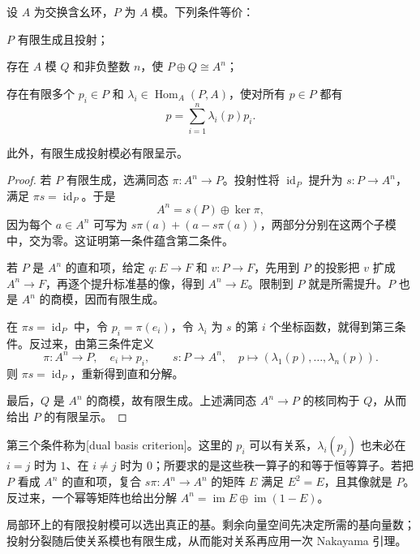 \begin{proposition}
\label{g5:prop:projective-dual-basis}
	设 \(A\) 为交换含幺环，\(P\) 为 \(A\) 模。下列条件等价：
	\begin{equivalences}
		\item \(P\) 有限生成且投射；
		\item 存在 \(A\) 模 \(Q\) 和非负整数 \(n\)，使 \(P\oplus Q\cong A^n\)；
		\item 存在有限多个 \(p_i\in P\) 和 \(\lambda_i\in\operatorname{Hom}_A(P,A)\)，使对所有 \(p\in P\) 都有
		\[
			p=\sum_{i=1}^n\lambda_i(p)p_i.
		\]
	\end{equivalences}
	此外，有限生成投射模必有限呈示。
\end{proposition}
\begin{proof}
	若 \(P\) 有限生成，选满同态 \(\pi:A^n\rightarrow P\)。投射性将 \(\operatorname{id}_P\) 提升为 \(s:P\rightarrow A^n\)，满足 \(\pi s=\operatorname{id}_P\)。于是
	\[
		A^n=s(P)\oplus\ker\pi,
	\]
	因为每个 \(a\in A^n\) 可写为 \(s\pi(a)+(a-s\pi(a))\)，两部分分别在这两个子模中，交为零。这证明第一条件蕴含第二条件。

	若 \(P\) 是 \(A^n\) 的直和项，给定 \(q:E\rightarrow F\) 和 \(v:P\rightarrow F\)，先用到 \(P\) 的投影把 \(v\) 扩成 \(A^n\rightarrow F\)，再逐个提升标准基的像，得到 \(A^n\rightarrow E\)。限制到 \(P\) 就是所需提升。\(P\) 也是 \(A^n\) 的商模，因而有限生成。

	在 \(\pi s=\operatorname{id}_P\) 中，令 \(p_i=\pi(e_i)\)，令 \(\lambda_i\) 为 \(s\) 的第 \(i\) 个坐标函数，就得到第三条件。反过来，由第三条件定义
	\[
		\pi:A^n\longrightarrow P,\quad e_i\longmapsto p_i,
		\qquad
		s:P\longrightarrow A^n,\quad
		p\longmapsto(\lambda_1(p),\ldots,\lambda_n(p)).
	\]
	则 \(\pi s=\operatorname{id}_P\)，重新得到直和分解。

	最后，\(Q\) 是 \(A^n\) 的商模，故有限生成。上述满同态 \(A^n\rightarrow P\) 的核同构于 \(Q\)，从而给出 \(P\) 的有限呈示。
\end{proof}

第三个条件称为[dual basis criterion]。这里的 \(p_i\) 可以有关系，\(\lambda_i(p_j)\) 也未必在 \(i=j\) 时为 \(1\)、在 \(i\ne j\) 时为 \(0\)；所要求的是这些秩一算子的和等于恒等算子。若把 \(P\) 看成 \(A^n\) 的直和项，复合 \(s\pi:A^n\rightarrow A^n\) 的矩阵 \(E\) 满足 \(E^2=E\)，且其像就是 \(P\)。反过来，一个幂等矩阵也给出分解 \(A^n=\operatorname{im}E\oplus\operatorname{im}(1-E)\)。

\ProseParagraphBreak

局部环上的有限投射模可以选出真正的基。剩余向量空间先决定所需的基向量数；投射分裂随后使关系模也有限生成，从而能对关系再应用一次 Nakayama 引理。

